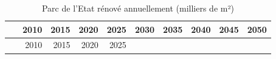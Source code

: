 \documentclass[]{article}
\begin{document}
\begin{longtable}[]{@{}crrrrrrrrr@{}}
\caption{Parc de l'Etat rénové annuellement (milliers de
m²)}\tabularnewline
\toprule
\begin{minipage}[b]{0.14\columnwidth}\centering\strut
~\strut
\end{minipage} & \begin{minipage}[b]{0.06\columnwidth}\raggedleft\strut
2010\strut
\end{minipage} & \begin{minipage}[b]{0.06\columnwidth}\raggedleft\strut
2015\strut
\end{minipage} & \begin{minipage}[b]{0.07\columnwidth}\raggedleft\strut
2020\strut
\end{minipage} & \begin{minipage}[b]{0.07\columnwidth}\raggedleft\strut
2025\strut
\end{minipage} & \begin{minipage}[b]{0.07\columnwidth}\raggedleft\strut
2030\strut
\end{minipage} & \begin{minipage}[b]{0.07\columnwidth}\raggedleft\strut
2035\strut
\end{minipage} & \begin{minipage}[b]{0.07\columnwidth}\raggedleft\strut
2040\strut
\end{minipage} & \begin{minipage}[b]{0.07\columnwidth}\raggedleft\strut
2045\strut
\end{minipage} & \begin{minipage}[b]{0.07\columnwidth}\raggedleft\strut
2050\strut
\end{minipage}\tabularnewline
\midrule
\endfirsthead
\toprule
\begin{minipage}[b]{0.14\columnwidth}\centering\strut
~\strut
\end{minipage} & \begin{minipage}[b]{0.06\columnwidth}\raggedleft\strut
2010\strut
\end{minipage} & \begin{minipage}[b]{0.06\columnwidth}\raggedleft\strut
2015\strut
\end{minipage} & \begin{minipage}[b]{0.07\columnwidth}\raggedleft\strut
2020\strut
\end{minipage} & \begin{minipage}[b]{0.07\columnwidth}\raggedleft\strut
2025\strut
\end{minipage} & \begin{minipage}[b]{0.07\columnwidth}\raggedleft\strut

\end{minipage}
\end{longtable}
\end{document}
